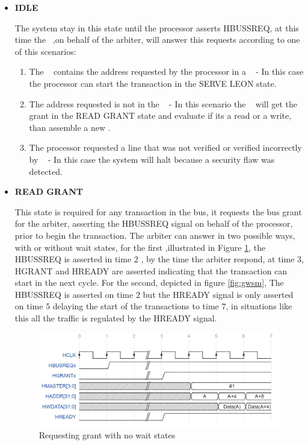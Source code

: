 \begin{itemize}
 \item{\textbf{IDLE}}
 
The system stay in this state until the processor asserts HBUSSREQ, at this time the \handler~,on behalf of the arbiter, will answer this requests according to one of this scenarios:
 \begin{enumerate}
     \item The \sbuf~ contains the address requested by the processor in a \sline~ - In this case the processor can start the transaction in the SERVE LEON state.
     \item The address requested is not in the \sbuf~ - In this scenario the \handler~ will get the grant in the READ GRANT state and evaluate if its a read or a write, than assemble a new \sline.
     \item The processor requested a line that was not verified  or verified incorrectly  by \seceng~ -  In this case the system will halt because a security flaw was detected.
 \end{enumerate}

 
  \item{\textbf{READ GRANT}}

  This state is required for any transaction in the bus, it requests the bus grant for the arbiter, asserting the HBUSSREQ signal on behalf of the processor, prior to begin the transaction. The arbiter can answer in two possible ways, with or without wait states, for the first ,illustrated in Figure \ref{fig:gnwsm},  the HBUSSREQ is asserted in time $2$ , by the time the arbiter respond, at time $3$, HGRANT and HREADY are asserted  indicating that the transaction can start in the next cycle. For the second, depicted in figure \ref{fig:gwsm}, The  HBUSSREQ is asserted on time $2$ but the HREADY signal is only asserted on time $5$ delaying the start of the transactions to time $7$, in situations like this all the traffic is regulated by the HREADY signal. 
  
  
\begin{figure}[!ht]
    \centering
    \includegraphics[width=\textwidth]{figures/others/read_grant_no_wait_new.JPG}
    \caption{Requesting grant with no wait states  }
    \label{fig:gnwsm}
\end{figure}



\end{itemize}
